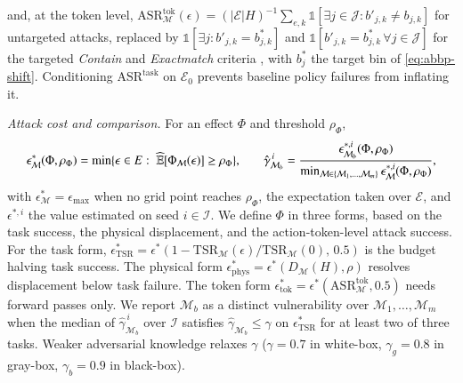 \documentclass[11pt,letterpaper]{article}
\begin{document}
and, at the token level,
$\mathrm{ASR}^{\mathrm{tok}}_{\mathcal{M}}(\epsilon)=(|\mathcal{E}|H)^{-1}\sum_{e,k}
\mathbb{1}[\exists j\in\mathcal{J}:b'_{j,k}\neq b_{j,k}]$ for untargeted attacks, replaced by
$\mathbb{1}[\exists j:b'_{j,k}{=}b^{*}_{j,k}]$ and $\mathbb{1}[b'_{j,k}{=}b^{*}_{j,k}\,\forall
j\in\mathcal{J}]$ for the targeted \textit{Contain} and \textit{Exactmatch} criteria
\cite{lu2024test,luo2024image}, with $b^{*}_{j}$ the target bin of \autoref{eq:abbp-shift}.
Conditioning $\mathrm{ASR}^{\mathrm{task}}$ on $\mathcal{E}_{0}$ prevents baseline policy
failures from inflating it. 

 \emph{Attack cost and comparison.} For an effect $\Phi$ and threshold
$\rho_{\Phi}$,
\vspace{-2.5ex}\begin{equation}
  \small
\epsilon^{*}_{\mathcal{M}}(\Phi,\rho_{\Phi})=\min\bigl\{\epsilon\in E:\;
\widehat{\mathbb{E}}\bigl[\Phi_{\mathcal{M}}(\epsilon)\bigr]\ge\rho_{\Phi}\bigr\},
\qquad
\hat{\gamma}^{\,i}_{\mathcal{M}_{b}}=
\frac{\epsilon^{*,i}_{\mathcal{M}_{b}}(\Phi,\rho_{\Phi})}
{\min_{\mathcal{M}\in\{\mathcal{M}_{1},\dots,\mathcal{M}_{m}\}}
\epsilon^{*,i}_{\mathcal{M}}(\Phi,\rho_{\Phi})},
\label{eq:budget-operator}
\vspace{-1.5ex}\end{equation}
with $\epsilon^{*}_{\mathcal{M}}=\epsilon_{\max}$ when no grid point reaches $\rho_{\Phi}$, the expectation taken over $\mathcal{E}$, and $\epsilon^{*,i}$ the value estimated on seed $i\in\mathcal{I}$. 
We define $\Phi$ in three forms, based on the task success, the physical displacement, and the action-token-level attack success. For the task form, 
$\epsilon^{*}_{\mathrm{TSR}}=\epsilon^{*}(1-\mathrm{TSR}_{\mathcal{M}}(\epsilon)/
\mathrm{TSR}_{\mathcal{M}}(0),\,0.5)$ is the budget halving task success. 
The physical form $\epsilon^{*}_{\mathrm{phys}}=\epsilon^{*}(D_{\mathcal{M}}(H),
\rho)$ resolves displacement below task failure. The token form
$\epsilon^{*}_{\mathrm{tok}}=\epsilon^{*}(\mathrm{ASR}^{\mathrm{tok}}_{\mathcal{M}},
0.5)$ needs forward passes only.
We report $\mathcal{M}_{b}$ as a distinct vulnerability over $\mathcal{M}_{1},\dots,\mathcal{M}_{m}$ when the median of $\hat{\gamma}^{\,i}_{ \mathcal{M}_{b}}$ over $\mathcal{I}$ satisfies $\hat{\gamma}_{\mathcal{M}_{b}}\le\gamma$ on $\epsilon^{*}_{\mathrm{TSR}}$ for at least two of three tasks. Weaker adversarial knowledge relaxes $\gamma$ ($\gamma{=}0.7$ in white-box, $\gamma_{g}{=}0.8$ in gray-box, $\gamma_{b}{=}0.9$ in black-box).
\end{document}
